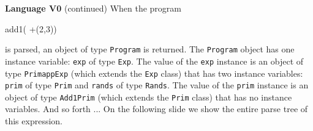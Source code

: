 \begin{minipage}[t]{\sw}
\slidenumber
\LARGE
{\bf Language V0} (continued)\exx
When the program
\begin{qv}
add1( +(2,3))
\end{qv}
is parsed,
an object of type \verb'Program' is returned.
The \verb'Program' object
has one instance variable: \verb'exp' of type \verb'Exp'.
The value of the \verb'exp' instance is an object
of type \verb'PrimappExp' (which extends the \verb'Exp' class)
that has two instance variables:
\verb'prim' of type \verb'Prim' and \verb'rands' of type \verb'Rands'.
The value of the \verb'prim' instance
is an object of type \verb'Add1Prim'
(which extends the \verb'Prim' class)
that has no instance variables.
And so forth ...\exx
On the following slide we show the entire parse tree of this expression.
\end{minipage}
